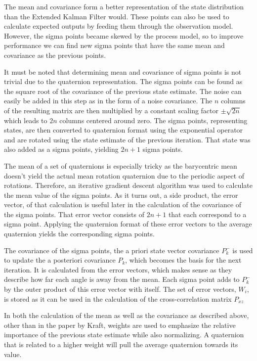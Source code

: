 \documentclass[letterpaper, 10 pt, conference]{ieeeconf}  %
\begin{document}
The mean and covariance form a better representation of the state distribution than the Extended Kalman Filter would. These points can also be used to calculate expected outputs by feeding them through the observation model. However, the sigma points became skewed by the process model, so to improve performance  we can find new sigma points that have the same mean and covariance as the previous points.

It must be noted that determining mean and covariance of sigma points is not trivial due to the quaternion representation. The sigma points can be found as the square root of the covariance of the previous state estimate. The noise can easily be added in this step as in the form of a noise covariance. The $n$ columns of the resulting matrix are then multiplied by a constant scaling factor $\pm \sqrt{2n}$ which leads to $2n$ columns centered around zero. The sigma points, representing states, are then converted to quaternion format using the exponential operator and are rotated using the state estimate of the previous iteration. That state was also added as a sigma points, yielding $2n+1$ sigma points.

The mean of a set of quaternions is especially tricky as the barycentric mean doesn't yield the actual mean rotation quaternion due to the periodic aspect of rotations. Therefore, an iterative gradient descent algorithm was used to calculate the mean value of the sigma points. As it turns out, a side product, the error vector, of that calculation is useful later in the calculation of the covariance of the sigma points. That error vector consists of $2n+1$ that each correspond to a sigma point. Applying the quaternion format of these error vectors to the average quaternion yields the corresponding sigma points.

The covariance of the sigma points, the a priori state vector covariance $P_k^-$ is used to update the a posteriori covariance $P_k$, which becomes the basis for the next iteration. It is calculated from the error vectors, which makes sense as they describe how far each angle is away from the mean. Each sigma point adds to $P_k^-$ by the outer product of this error vector with itself. The set of error vectors, $W_i$, is stored as it can be used in the calculation of the cross-correlation matrix $P_{xz}$

In both the calculation of the mean as well as the covariance as described above, other than in the paper by Kraft, weights are used to emphasize the relative importance of the previous state estimate while also normalizing. A quaternion that is related to a higher weight will pull the average quaternion towards its value. 
\end{document}
